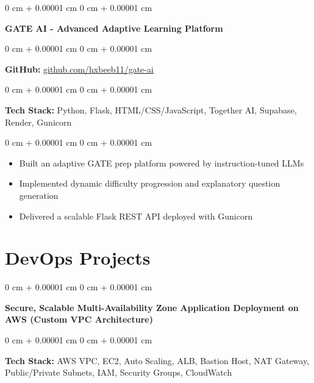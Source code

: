 \documentclass[10pt, letterpaper]{article}
\newenvironment{highlights}{
    \begin{itemize}[
        topsep=0.10 cm,
        parsep=0.10 cm,
        partopsep=0pt,
        itemsep=0pt,
        leftmargin=0 cm + 10pt
    ]
}{
    \end{itemize}
} %
\newenvironment{onecolentry}{
    \begin{adjustwidth}{
        0 cm + 0.00001 cm
    }{
        0 cm + 0.00001 cm
    }
}{
    \end{adjustwidth}
} %
\let\hrefOriginal\href
\renewcommand{\href}[2]{\hrefOriginal{#1}{\uline{#2}}}
\begin{document}
    \vspace{0.5 cm}

    \begin{onecolentry}
        \textbf{GATE AI - Advanced Adaptive Learning Platform}  
    \end{onecolentry}

    \vspace{0.10 cm}

    \vspace{0.10 cm}

    \begin{onecolentry}
        \textbf{GitHub:} \href{https://github.com/hxbeeb11/gate-ai}
        {github.com/hxbeeb11/gate-ai}  
    \end{onecolentry}

    \vspace{0.10 cm}

    \begin{onecolentry}
        \textbf{Tech Stack:} Python, Flask, HTML/CSS/JavaScript, Together AI, Supabase, Render, Gunicorn  
    \end{onecolentry}

    \vspace{0.10 cm}

    \begin{onecolentry}
        \begin{highlights}
            \item Built an adaptive GATE prep platform powered by  instruction-tuned LLMs
            \item Implemented dynamic difficulty progression and explanatory question generation
            \item Delivered a scalable Flask REST API deployed with Gunicorn
        \end{highlights}
    \end{onecolentry}

    \section{DevOps Projects}
    \begin{onecolentry}
        \textbf{Secure, Scalable Multi-Availability Zone Application Deployment on AWS (Custom VPC Architecture)}  
    \end{onecolentry}

    \vspace{0.10 cm}

    \begin{onecolentry}
        \textbf{Tech Stack:} AWS VPC, EC2, Auto Scaling, ALB, Bastion Host, NAT Gateway, Public/Private Subnets, IAM, Security Groups, CloudWatch  
    \end{onecolentry}
\end{document}
